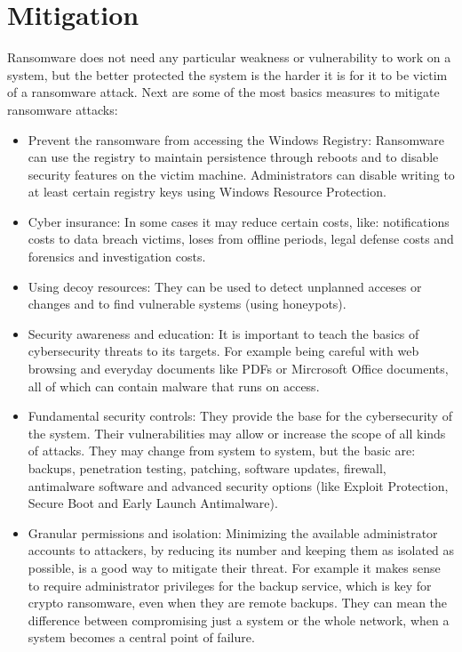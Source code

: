 \section{Mitigation}
Ransomware does not need any particular weakness or vulnerability to work on a system, but the better protected the system is the harder it is for it to be victim of a ransomware attack.
Next are some of the most basics measures to mitigate ransomware attacks\cite{ransomware_oReilly}\cite{ransomware_digital_extortion}\cite{hardening_windows_10}:
\begin{itemize}
	\item Prevent the ransomware from accessing the Windows Registry:
Ransomware can use the registry to maintain persistence through reboots and to disable security features on the victim machine.
Administrators can disable writing to at least certain registry keys using Windows Resource Protection.
	\item Cyber insurance:
In some cases it may reduce certain costs, like: notifications costs to data breach victims, loses from offline periods, legal defense costs and forensics and investigation costs.
	\item Using decoy resources:
They can be used to detect unplanned acceses or changes and to find vulnerable systems (using honeypots).
	\item Security awareness and education:
It is important to teach the basics of cybersecurity threats to its targets.
For example being careful with web browsing and everyday documents like PDFs or Mircrosoft Office documents, all of which can contain malware that runs on access.
	\item Fundamental security controls:
They provide the base for the cybersecurity of the system.
Their vulnerabilities may allow or increase the scope of all kinds of attacks.
They may change from system to system, but the basic are: backups, penetration testing, patching, software updates, firewall, antimalware software and advanced security options (like Exploit Protection, Secure Boot and Early Launch Antimalware).
	\item Granular permissions and isolation:
Minimizing the available administrator accounts to attackers, by reducing its number and keeping them as isolated as possible, is a good way to mitigate their threat.
For example it makes sense to require administrator privileges for the backup service, which is key for crypto ransomware, even when they are remote backups.
They can mean the difference between compromising just a system or the whole network, when a system becomes a central point of failure.

\end{itemize}
